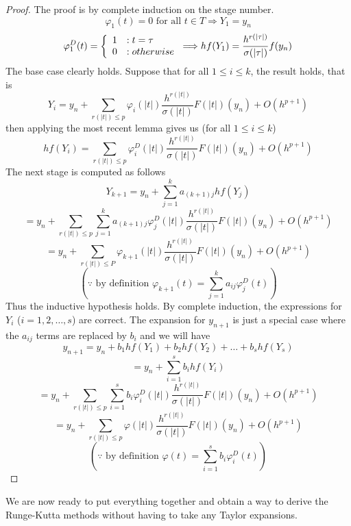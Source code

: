 \documentclass[12pt]{amsart}
\theoremstyle{definition}
\begin{document}
  \begin{proof}The proof is by complete induction on the stage number.
	$$\varphi_1(t) = 0 \mbox{ for all } t \in T \Longrightarrow Y_1 = y_n$$
	$$\varphi_1^D(t) = \left\{ 
		\begin{array}{l l}
		1 & : t = \tau \\
		0 & : otherwise
		\end{array}
	\right.
	\Longrightarrow
	hf(Y_1) = \frac{h^{r(|\tau|)}}{\sigma(|\tau|)}f(y_n)$$ \newline
	The base case clearly holds. \newline \newline
	Suppose that for all $1 \le i \le k$, the result holds, that is
	$$Y_i = y_n + \sum_{r(|t|) \le p}{\varphi_i(|t|)\frac{h^{r(|t|)}}{\sigma(|t|)}F(|t|)(y_n)} + O(h^{p + 1})$$
	then applying the most recent lemma gives us (for all $1 \le i \le k$)
	$$hf(Y_i) = \sum_{r(|t|) \le p}{\varphi_i^D(|t|)\frac{h^{r(|t|)}}{\sigma(|t|)}F(|t|)(y_n) } + O(h^{p + 1})$$
	The next stage is computed as follows
	$$Y_{k + 1} = y_n + \sum_{j = 1}^k{a_{(k+1)j}hf(Y_j)}$$ 
	$$= y_n + \sum_{r(|t|) \le p}{\sum_{j = 1}^k{a_{(k+1)j} {\varphi_j^D(|t|)} \frac{h^{r(|t|)}}
	{\sigma(|t|)}F(|t|)(y_n) } } + O(h^{p + 1})$$
	$$= y_n + \sum_{r(|t|) \le P}{\varphi_{k + 1}(|t|) \frac{h^{r(|t|)}}{\sigma(|t|)}F(|t|)(y_n)} + O(h^{p + 1})$$
	$$(\because \mbox{ by definition } \varphi_{k + 1}(t) = \sum_{j = 1}^{k}{a_{ij}\varphi_j^D(t)})$$
	Thus the inductive hypothesis holds. By complete induction, the expressions for $Y_i$ ($i = 1, 2, \dots, s$) 
	are correct. \newline \newline
	 The expansion for $y_{n + 1}$ is just a special case where the $a_{ij}$ terms are replaced by $b_i$ and we will have
	 $$ y_{n + 1} = y_n + b_1hf(Y_1) + b_2hf(Y_2) + \dots + b_shf(Y_s)$$
	 $$= y_n + \sum_{i = 1}^s{b_ihf(Y_i)}$$
	 $$= y_n + \sum_{r(|t|) \le p}{\sum_{i = 1}^s{b_i {\varphi_i^D(|t|)} \frac{h^{r(|t|)}}
	{\sigma(|t|)}F(|t|)(y_n) } } + O(h^{p + 1}) $$
	$$= y_n + \sum_{r(|t|) \le p}{\varphi(|t|)\frac{h^{r(|t|)}}{\sigma(|t|)}F(|t|)(y_n)} + O(h^{p + 1})$$
	 $$(\because \mbox{ by definition }\varphi(t) = \sum_{i = 1}^s{b_i\varphi_i^D(t)})$$
  \end{proof}
  We are now ready to put everything together and obtain a way to derive the Runge-Kutta methods
  without having to take any Taylor expansions.
  \pagebreak
  
\end{document}
